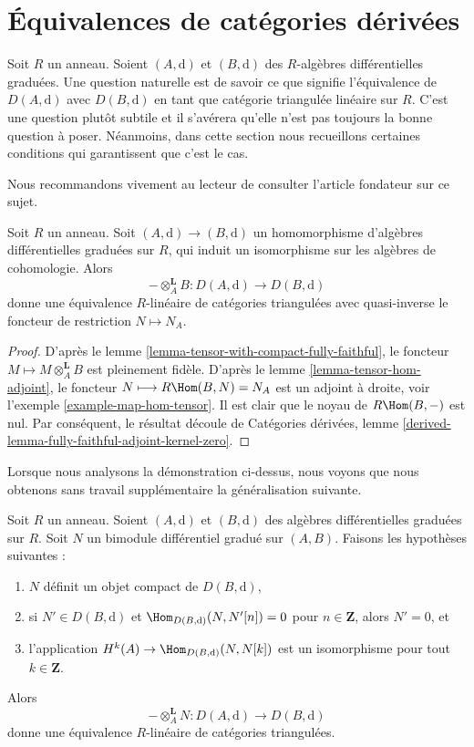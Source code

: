 \section{Équivalences de catégories dérivées}
\label{section-equivalence}

\noindent
Soit $R$ un anneau. Soient $(A, \text{d})$ et $(B, \text{d})$ des $R$-algèbres
différentielles graduées. Une question naturelle est de savoir ce que
signifie l'équivalence de $D(A, \text{d})$ avec $D(B, \text{d})$ en tant que
catégorie triangulée linéaire sur $R$. C'est une question plutôt subtile et il
s'avérera qu'elle n'est pas toujours la bonne question à poser.
Néanmoins, dans cette section nous recueillons certaines conditions qui
garantissent que c'est le cas.

\medskip\noindent
Nous recommandons vivement au lecteur de consulter l'article
fondateur \cite{Rickard} sur ce sujet.

\begin{lemma}
\label{lemma-qis-equivalence}
Soit $R$ un anneau. Soit $(A, \text{d}) \to (B, \text{d})$ un
homomorphisme d'algèbres différentielles graduées sur $R$, qui induit un
isomorphisme sur les algèbres de cohomologie. Alors
$$
- \otimes_A^\mathbf{L} B : D(A, \text{d}) \to D(B, \text{d})
$$
donne une équivalence $R$-linéaire de catégories triangulées avec
quasi-inverse le foncteur de restriction $N \mapsto N_A$.
\end{lemma}

\begin{proof}
D'après le lemme
\ref{lemma-tensor-with-compact-fully-faithful}, le foncteur $M \longmapsto M \otimes_A^\mathbf{L} B$ est
pleinement fidèle. D'après le lemme
\ref{lemma-tensor-hom-adjoint}, le foncteur $N \longmapsto R\Hom(B, N) = N_A$ est un adjoint à droite,
voir l'exemple
\ref{example-map-hom-tensor}. Il est clair que le noyau de $R\Hom(B, -)$ est nul. Par
conséquent, le résultat découle de
Catégories dérivées, lemme
\ref{derived-lemma-fully-faithful-adjoint-kernel-zero}.
\end{proof}

\noindent
Lorsque nous analysons la démonstration ci-dessus, nous voyons que nous obtenons sans
travail supplémentaire la généralisation suivante.

\begin{lemma}
\label{lemma-tilting-equivalence}
Soit $R$ un anneau. Soient $(A, \text{d})$ et $(B, \text{d})$ des algèbres
différentielles graduées sur $R$. Soit $N$ un bimodule
différentiel gradué sur $(A, B)$. Faisons les hypothèses suivantes :
\begin{enumerate}
\item $N$ définit un objet compact de $D(B, \text{d})$,
\item si $N' \in D(B, \text{d})$ et
$\Hom_{D(B, \text{d})}(N, N'[n]) = 0$ pour $n \in \mathbf{Z}$,
alors $N' = 0$, et
\item l'application $H^k(A) \to \Hom_{D(B, \text{d})}(N, N[k])$ est
un isomorphisme pour tout $k \in \mathbf{Z}$.
\end{enumerate}
Alors
$$
- \otimes_A^\mathbf{L} N : D(A, \text{d}) \to D(B, \text{d})
$$
donne une équivalence $R$-linéaire de catégories triangulées.
\end{lemma}

